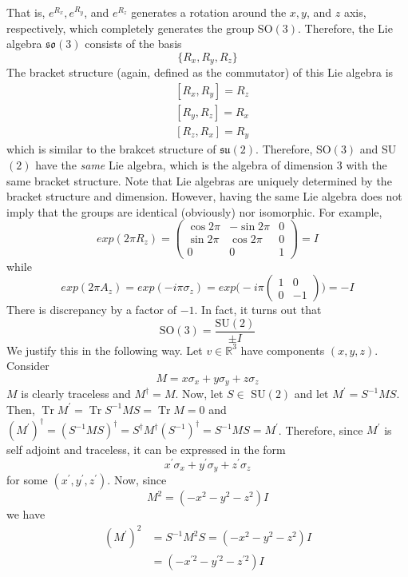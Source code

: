 \documentclass{article}
\DeclareMathOperator{\Tr}{Tr}
\begin{document}
      That is, $e^{R_x}, e^{R_y}$, and $e^{R_z}$ generates a rotation around the $x, y$, and $z$ axis, respectively, which completely generates the group SO$(3)$. Therefore, the Lie algebra $\mathfrak{so}(3)$ consists of the basis 
      \[\{R_x, R_y, R_z\}\]
      The bracket structure (again, defined as the commutator) of this Lie algebra is 
      \begin{align*}
          & [R_x, R_y] = R_z \\
          & [R_y, R_z] = R_x \\
          & [R_z, R_x] = R_y
      \end{align*}
      which is similar to the brakcet structure of $\mathfrak{su}(2)$. Therefore, SO$(3)$ and SU$(2)$ have the \textit{same} Lie algebra, which is the algebra of dimension 3 with the same bracket structure. Note that Lie algebras are uniquely determined by the bracket structure and dimension. However, having the same Lie algebra does not imply that the groups are identical (obviously) nor isomorphic. For example, 
      \[exp(2\pi R_z) = \begin{pmatrix}
      \cos{2\pi} & -\sin{2\pi} & 0 \\
      \sin{2\pi} & \cos{2\pi} & 0 \\
      0 & 0 & 1
      \end{pmatrix} = I\]
      while 
      \[exp(2\pi A_z) = 
      exp(-i \pi \sigma_z) = exp \bigg(-i \pi \begin{pmatrix}
      1&0\\0&-1
      \end{pmatrix} \bigg) = -I\]
      There is discrepancy by a factor of $-1$. In fact, it turns out that
      \[\text{SO}(3) = \frac{\text{SU}(2)}{\pm I}\]
      We justify this in the following way. Let $v \in \mathbb{R}^3$ have components $(x, y, z)$. Consider
      \[M = x \sigma_x + y \sigma_y + z \sigma_z\]
      $M$ is clearly traceless and $M^\dagger = M$. Now, let $S \in$ SU$(2)$ and let $M^\prime = S^{-1} M S$. Then, $\Tr{M^\prime} = \Tr{S^{-1} M S} = \Tr{M} = 0$ and $(M^\prime)^\dagger = (S^{-1} M S)^\dagger = S^\dagger M^\dagger (S^{-1})^\dagger = S^{-1} M S = M^\prime$. Therefore, since $M^\prime$ is self adjoint and traceless, it can be expressed in the form
      \[x^\prime \sigma_x + y^\prime \sigma_y + z^\prime \sigma_z\]
      for some $(x^\prime, y^\prime, z^\prime)$. Now, since 
      \[M^2 = (-x^2 - y^2 - z^2) I\]
      we have 
      \begin{align*}
          (M^\prime)^2 & = S^{-1} M^2 S = (-x^2 - y^2 - z^2) I \\
          & = (-x^{\prime 2} - y^{\prime 2} - z^{\prime 2}) I 
      \end{align*}
\end{document}
